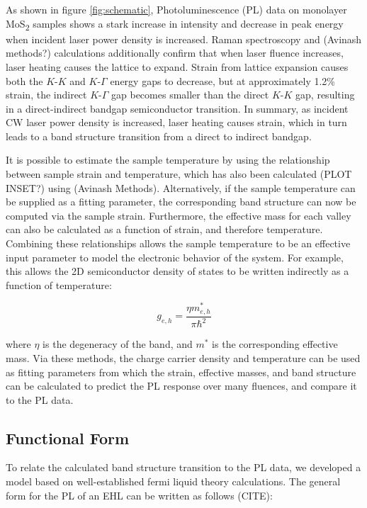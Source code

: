 \documentclass[aps,prb,preprint,groupedaddress]{revtex4-2}
\begin{document}
As shown in figure \ref{fig:schematic}, Photoluminescence (PL) data on monolayer MoS\textsubscript{2} samples shows a stark increase in intensity and decrease in peak energy when incident laser power density is increased. Raman spectroscopy and (Avinash methods?) calculations additionally confirm that when laser fluence increases, laser heating causes the lattice to expand. Strain from lattice expansion causes both the $K$-$K$ and $K$-$\Gamma$ energy gaps to decrease, but at approximately 1.2\% strain, the indirect $K$-$\Gamma$ gap becomes smaller than the direct $K$-$K$ gap, resulting in a direct-indirect bandgap semiconductor transition. In summary, as incident CW laser power density is increased, laser heating causes strain, which in turn leads to a band structure transition from a direct to indirect bandgap.

It is possible to estimate the sample temperature by using the relationship between sample strain and temperature, which has also been calculated (PLOT INSET?) using (Avinash Methods). Alternatively, if the sample temperature can be supplied as a fitting parameter, the corresponding band structure can now be computed via the sample strain. Furthermore, the effective mass for each valley can also be calculated as a function of strain, and therefore temperature. Combining these relationships allows the sample temperature to be an effective input parameter to model the electronic behavior of the system. For example, this allows the 2D semiconductor density of states to be written indirectly as a function of temperature:

\begin{equation} \label{2D density of states}
g_{e,h} = \frac{\eta m_{e,h}^*}{\pi \hbar^2}
\end{equation}

where $\eta$ is the degeneracy of the band, and $m^*$ is the corresponding effective mass. Via these methods, the charge carrier density and temperature can be used as fitting parameters from which the strain, effective masses, and band structure can be calculated to predict the PL response over many fluences, and compare it to the PL data.

\subsection{Functional Form}

To relate the calculated band structure transition to the PL data, we developed a model based on well-established fermi liquid theory calculations. The general form for the PL of an EHL can be written as follows (CITE):
\end{document}
